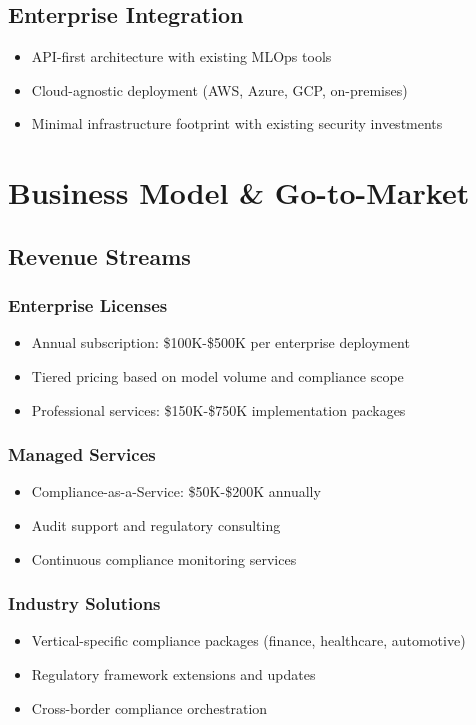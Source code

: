 \documentclass[12pt,a4paper]{article}
\begin{document}
\subsection{Enterprise Integration}
\begin{itemize}
    \item API-first architecture with existing MLOps tools
    \item Cloud-agnostic deployment (AWS, Azure, GCP, on-premises)
    \item Minimal infrastructure footprint with existing security investments
\end{itemize}

\section{Business Model \& Go-to-Market}

\subsection{Revenue Streams}

\subsubsection{Enterprise Licenses}
\begin{itemize}
    \item Annual subscription: \$100K-\$500K per enterprise deployment
    \item Tiered pricing based on model volume and compliance scope
    \item Professional services: \$150K-\$750K implementation packages
\end{itemize}

\subsubsection{Managed Services}
\begin{itemize}
    \item Compliance-as-a-Service: \$50K-\$200K annually
    \item Audit support and regulatory consulting
    \item Continuous compliance monitoring services
\end{itemize}

\subsubsection{Industry Solutions}
\begin{itemize}
    \item Vertical-specific compliance packages (finance, healthcare, automotive)
    \item Regulatory framework extensions and updates
    \item Cross-border compliance orchestration
\end{itemize}
\end{document}
